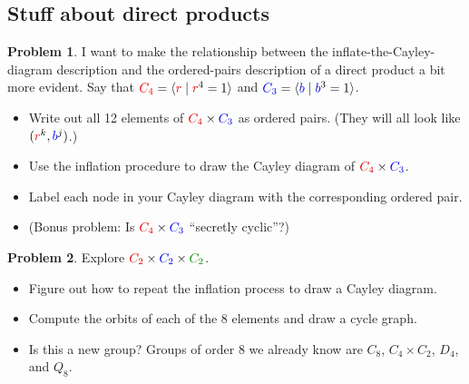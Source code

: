 \documentclass[12pt]{article}
\theoremstyle{definition} %
\newtheorem{problem}{Problem}
\newcommand{\Alert}[1]{\textcolor{xRed}{#1}}
\newcommand{\Balert}[1]{\textcolor{xBlue}{#1}}
\newcommand{\Galert}[1]{\textcolor{xGreen}{#1}}
\def\<{\langle}
\def\>{\rangle}
\begin{document}
\subsection*{Stuff about direct products}

\begin{problem}
    I want to make the relationship between the inflate-the-Cayley-diagram description and the ordered-pairs description of a direct product a bit more evident. Say that $\Alert{C_4} = \<\Alert{r} \mid \Alert{r}^4 = 1\>$ and $\Balert{C_3} = \< \Balert{b} \mid \Balert{b}^3 = 1\>$. 
    \begin{itemize}
        \item Write out all 12 elements of $\Alert{C_4}\times \Balert{C_3}$ as ordered pairs. (They will all look like $(\Alert{r}^k, \Balert{b}^j)$.)
        \item Use the inflation procedure to draw the Cayley diagram of $\Alert{C_4}\times \Balert{C_3}$.
        \item Label each node in your Cayley diagram with the corresponding ordered pair.
        \item (Bonus problem: Is $\Alert{C_4}\times \Balert{C_3}$ ``secretly cyclic''?)
    \end{itemize}
\end{problem}

\begin{problem}
    Explore $\Alert{C_2} \times \Balert{C_2} \times \Galert{C_2}$.
    \begin{itemize}
        \item Figure out how to repeat the inflation process to draw a Cayley diagram.
        \item Compute the orbits of each of the 8 elements and draw a cycle graph.
        \item Is this a new group? Groups of order 8 we already know are $C_8$, $C_4 \times C_2$, $D_4$, and $Q_8$. 
    \end{itemize}
\end{problem}
\end{document}
